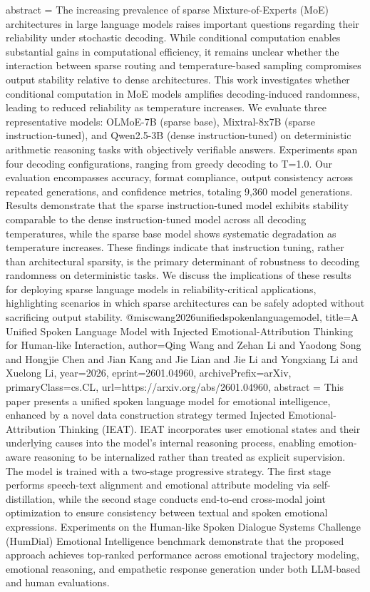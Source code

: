 {      abstract = {The increasing prevalence of sparse Mixture-of-Experts (MoE) architectures in large language models raises important questions regarding their reliability under stochastic decoding. While conditional computation enables substantial gains in computational efficiency, it remains unclear whether the interaction between sparse routing and temperature-based sampling compromises output stability relative to dense architectures. This work investigates whether conditional computation in MoE models amplifies decoding-induced randomness, leading to reduced reliability as temperature increases. We evaluate three representative models: OLMoE-7B (sparse base), Mixtral-8x7B (sparse instruction-tuned), and Qwen2.5-3B (dense instruction-tuned) on deterministic arithmetic reasoning tasks with objectively verifiable answers. Experiments span four decoding configurations, ranging from greedy decoding to T=1.0. Our evaluation encompasses accuracy, format compliance, output consistency across repeated generations, and confidence metrics, totaling 9,360 model generations. Results demonstrate that the sparse instruction-tuned model exhibits stability comparable to the dense instruction-tuned model across all decoding temperatures, while the sparse base model shows systematic degradation as temperature increases. These findings indicate that instruction tuning, rather than architectural sparsity, is the primary determinant of robustness to decoding randomness on deterministic tasks. We discuss the implications of these results for deploying sparse language models in reliability-critical applications, highlighting scenarios in which sparse architectures can be safely adopted without sacrificing output stability.}
}@misc{wang2026unifiedspokenlanguagemodel,
      title={A Unified Spoken Language Model with Injected Emotional-Attribution Thinking for Human-like Interaction}, 
      author={Qing Wang and Zehan Li and Yaodong Song and Hongjie Chen and Jian Kang and Jie Lian and Jie Li and Yongxiang Li and Xuelong Li},
      year={2026},
      eprint={2601.04960},
      archivePrefix={arXiv},
      primaryClass={cs.CL},
      url={https://arxiv.org/abs/2601.04960},
      abstract = {This paper presents a unified spoken language model for emotional intelligence, enhanced by a novel data construction strategy termed Injected Emotional-Attribution Thinking (IEAT). IEAT incorporates user emotional states and their underlying causes into the model's internal reasoning process, enabling emotion-aware reasoning to be internalized rather than treated as explicit supervision. The model is trained with a two-stage progressive strategy. The first stage performs speech-text alignment and emotional attribute modeling via self-distillation, while the second stage conducts end-to-end cross-modal joint optimization to ensure consistency between textual and spoken emotional expressions. Experiments on the Human-like Spoken Dialogue Systems Challenge (HumDial) Emotional Intelligence benchmark demonstrate that the proposed approach achieves top-ranked performance across emotional trajectory modeling, emotional reasoning, and empathetic response generation under both LLM-based and human evaluations.}
}
